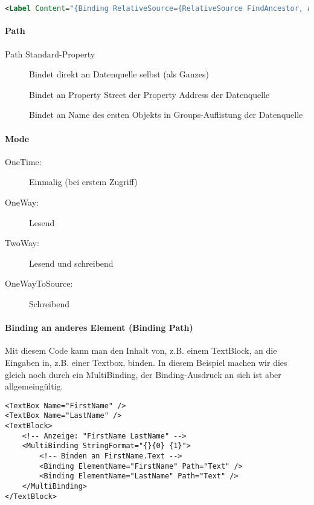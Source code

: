 \begin{lstlisting}[language=xml]
<Label Content="{Binding RelativeSource={RelativeSource FindAncestor, AncestorType=Window}, Path=Title}" />
\end{lstlisting}


\paragraph{Path} 
\begin{description}
    \item[Path Standard-Property] 
    \item[] Bindet direkt an Datenquelle selbst (als Ganzes)
    \item[] Bindet an Property Street der Property Address der Datenquelle
    \item[] Bindet an Name des ersten Objekts in Groups-Auflistung der Datenquelle
\end{description}
\paragraph{Mode}
\begin{description}
    \item[OneTime:] Einmalig (bei erstem Zugriff) 
    \item[OneWay:] Lesend
    \item[TwoWay:] Lesend und schreibend 
    \item[OneWayToSource:] Schreibend 
\end{description}

\paragraph{Binding an anderes Element (Binding Path)}
Mit diesem Code kann man den Inhalt von, z.B. einem TextBlock, an die Eingaben in, z.B. einer Textbox, binden. In diesem Beispiel machen wir dies gleich noch durch ein MultiBinding, der Binding-Ausdruck an sich ist aber allgemeingültig.
\begin{lstlisting}
<TextBox Name="FirstName" />
<TextBox Name="LastName" />
<TextBlock>
    <!-- Anzeige: "FirstName LastName" -->
    <MultiBinding StringFormat="{}{0} {1}">
        <!-- Binden an FirstName.Text -->
        <Binding ElementName="FirstName" Path="Text" />
        <Binding ElementName="LastName" Path="Text" />
    </MultiBinding>
</TextBlock>
\end{lstlisting}

